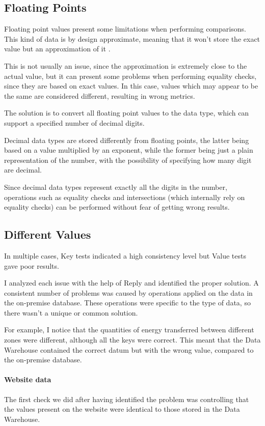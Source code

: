 \subsection{Floating Points}
    Floating point values present some limitations when performing comparisons.
    This kind of data is by design approximate, meaning that it won't store the exact value but an approximation of it \cite{bib:tests:float_intersect}.
    
    This is not usually an issue, since the approximation is extremely close to the actual value, but it can present some problems when performing equality checks, since they are based on exact values.
    In this case, values which may appear to be the same are considered different, resulting in wrong metrics.
    
    The solution is to convert all floating point values to the  data type, which can support a specified number of decimal digits.
    
    Decimal data types are stored differently from floating points, the latter being based on a value multiplied by an exponent, while the former being just a plain representation of the number, with the possibility of specifying how many digit are decimal.
    
    Since decimal data types represent exactly all the digits in the number, operations such as equality checks and intersections (which internally rely on equality checks) can be performed without fear of getting wrong results.

\subsection{Different Values}
    In multiple cases, Key tests indicated a high consistency level but Value tests gave poor results.
    
    I analyzed each issue with the help of Reply and identified the proper solution.
    A consistent number of problems was caused by operations applied on the data in the on-premise database.
    These operations were specific to the type of data, so there wasn't a unique or common solution.
    
    For example, I notice that the quantities of energy transferred between different zones were different, although all the keys were correct.
    This meant that the Data Warehouse contained the correct datum but with the wrong value, compared to the on-premise database.
    
    \paragraph{Website data}
        The first check we did after having identified the problem was controlling that the values present on the website were identical to those stored in the Data Warehouse.
        

